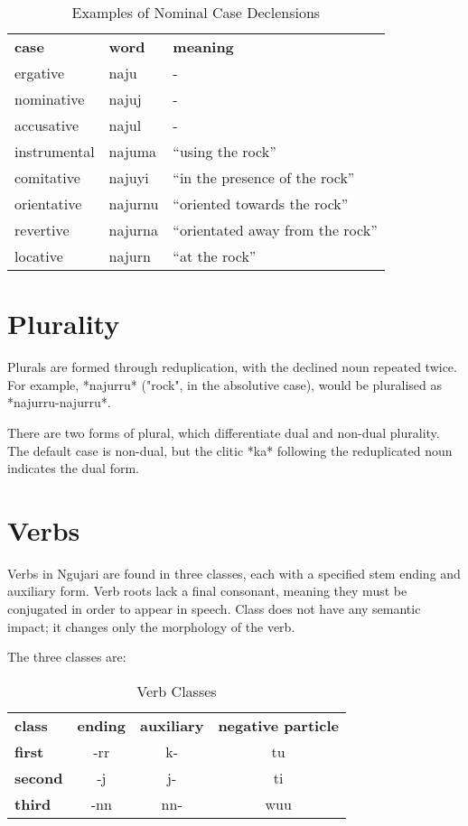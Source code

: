 \begin{table}[h]
\centering
\begin{tabular}{lll}
\textbf{case} & \textbf{word} & \textbf{meaning}\\
ergative & naju & -\\
nominative & najuj & -\\
accusative & najul & -\\
instrumental & najuma & ``using the rock''\\
comitative & najuyi & ``in the presence of the rock''\\
orientative & najurnu & ``oriented towards the rock''\\
revertive & najurna & ``orientated away from the rock''\\
locative & najurn & ``at the rock''\\
\end{tabular}
\caption{Examples of Nominal Case Declensions}
\end{table}

\section{Plurality}

Plurals are formed through reduplication, with the declined noun repeated twice.
For example, *najurru* ("rock", in the absolutive case), would be pluralised as
*najurru-najurru*.

There are two forms of plural, which differentiate dual and non-dual plurality.
The default case is non-dual, but the clitic *ka* following the reduplicated
noun indicates the dual form.

\section{Verbs}

Verbs in Ngujari are found in three classes, each with a specified stem ending
and auxiliary form. Verb roots lack a final consonant, meaning they must be
conjugated in order to appear in speech. Class does not have any semantic
impact; it changes only the morphology of the verb.

The three classes are:

\begin{table}[h]
\centering
\begin{tabular}{lccc}
\textbf{class} & \textbf{ending} & \textbf{auxiliary} & \textbf{negative particle}\\
\textbf{first} & -rr & k- & tu\\
\textbf{second} & -j & j- & ti\\
\textbf{third} & -nn & nn- & wuu\\
\end{tabular}
\caption{Verb Classes}
\end{table}

